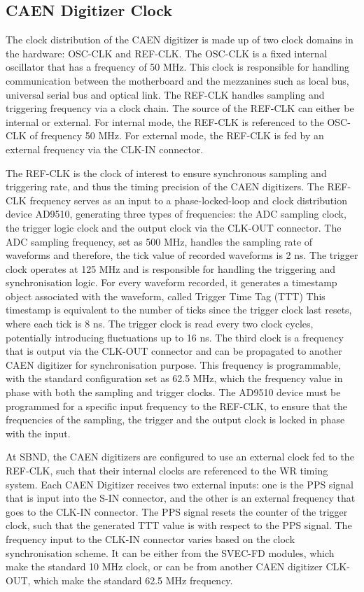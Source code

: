 \subsection{CAEN Digitizer Clock}
\label{section5.4.1}
The clock distribution of the CAEN digitizer is made up of two clock domains in the hardware: OSC-CLK and REF-CLK.
The OSC-CLK is a fixed internal oscillator that has a frequency of 50 MHz. 
This clock is responsible for handling communication between the motherboard and the mezzanines such as local bus, universal serial bus and optical link.
The REF-CLK handles sampling and triggering frequency via a clock chain.
The source of the REF-CLK can either be internal or external.
For internal mode, the REF-CLK is referenced to the OSC-CLK of frequency 50 MHz.
For external mode, the REF-CLK is fed by an external frequency via the CLK-IN connector. 

The REF-CLK is the clock of interest to ensure synchronous sampling and triggering rate, and thus the timing precision of the CAEN digitizers.
The REF-CLK frequency serves as an input to a phase-locked-loop and clock distribution device AD9510, generating three types of frequencies: the ADC sampling clock, the trigger logic clock and the output clock via the CLK-OUT connector.
The ADC sampling frequency, set as 500 MHz, handles the sampling rate of waveforms and therefore, the tick value of recorded waveforms is 2 ns. 
The trigger clock operates at 125 MHz and is responsible for handling the triggering and synchronisation logic.
For every waveform recorded, it generates a timestamp object associated with the waveform, called Trigger Time Tag (TTT)
This timestamp is equivalent to the number of ticks since the trigger clock last resets, where each tick is 8 ns.
The trigger clock is read every two clock cycles, potentially introducing fluctuations up to 16 ns.
The third clock is a frequency that is output via the CLK-OUT connector and can be propagated to another CAEN digitizer for synchronisation purpose.
This frequency is programmable, with the standard configuration set as 62.5 MHz, which the frequency value in phase with both the sampling and trigger clocks.
The AD9510 device must be programmed for a specific input frequency to the REF-CLK, to ensure that the frequencies of the sampling, the trigger and the output clock is locked in phase with the input.

At SBND, the CAEN digitizers are configured to use an external clock fed to the REF-CLK, such that their internal clocks are referenced to the WR timing system. 
Each CAEN Digitizer receives two external inputs: one is the PPS signal that is input into the S-IN connector, and the other is an external frequency that goes to the CLK-IN connector.
The PPS signal resets the counter of the trigger clock, such that the generated TTT value is with respect to the PPS signal.
The frequency input to the CLK-IN connector varies based on the clock synchronisation scheme. 
It can be either from the SVEC-FD modules, which make the standard 10 MHz clock, or can be from another CAEN digitizer CLK-OUT, which make the standard 62.5 MHz frequency.

